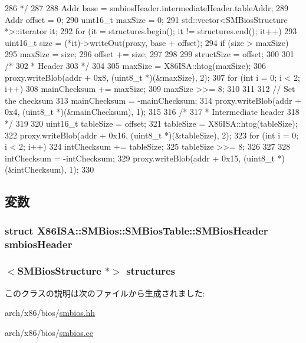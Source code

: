 \begin{DoxyCode}
{286      */
287 
288     Addr base = smbiosHeader.intermediateHeader.tableAddr;
289     Addr offset = 0;
290     uint16_t maxSize = 0;
291     std::vector<SMBiosStructure *>::iterator it;
292     for (it = structures.begin(); it != structures.end(); it++) {
293         uint16_t size = (*it)->writeOut(proxy, base + offset);
294         if (size > maxSize)
295             maxSize = size;
296         offset += size;
297     }
298 
299     structSize = offset;
300 
301     /*
302      * Header
303      */
304 
305     maxSize = X86ISA::htog(maxSize);
306     proxy.writeBlob(addr + 0x8, (uint8_t *)(&maxSize), 2);
307     for (int i = 0; i < 2; i++) {
308         mainChecksum += maxSize;
309         maxSize >>= 8;
310     }
311 
312     // Set the checksum
313     mainChecksum = -mainChecksum;
314     proxy.writeBlob(addr + 0x4, (uint8_t *)(&mainChecksum), 1);
315 
316     /*
317      * Intermediate header
318      */
319 
320     uint16_t tableSize = offset;
321     tableSize = X86ISA::htog(tableSize);
322     proxy.writeBlob(addr + 0x16, (uint8_t *)(&tableSize), 2);
323     for (int i = 0; i < 2; i++) {
324         intChecksum += tableSize;
325         tableSize >>= 8;
326     }
327 
328     intChecksum = -intChecksum;
329     proxy.writeBlob(addr + 0x15, (uint8_t *)(&intChecksum), 1);
330 }
\end{DoxyCode}


\subsection{変数}
\hypertarget{classX86ISA_1_1SMBios_1_1SMBiosTable_afd906d478b7ba5149013125da68c4eb9}{
\subsubsection[{smbiosHeader}]{\setlength{\rightskip}{0pt plus 5cm}struct {\bf X86ISA::SMBios::SMBiosTable::SMBiosHeader}  {\bf smbiosHeader}}}
\label{classX86ISA_1_1SMBios_1_1SMBiosTable_afd906d478b7ba5149013125da68c4eb9}
\hypertarget{classX86ISA_1_1SMBios_1_1SMBiosTable_a6fbbb38d1b8f7ce977a28367efb09b7c}{
\subsubsection[{structures}]{$<${\bf SMBiosStructure} $\ast$$>$ {\bf structures}}}
\label{classX86ISA_1_1SMBios_1_1SMBiosTable_a6fbbb38d1b8f7ce977a28367efb09b7c}


このクラスの説明は次のファイルから生成されました:\begin{DoxyCompactItemize}
\item 
arch/x86/bios/\hyperlink{smbios_8hh}{smbios.hh}\item 
arch/x86/bios/\hyperlink{smbios_8cc}{smbios.cc}\end{DoxyCompactItemize}
